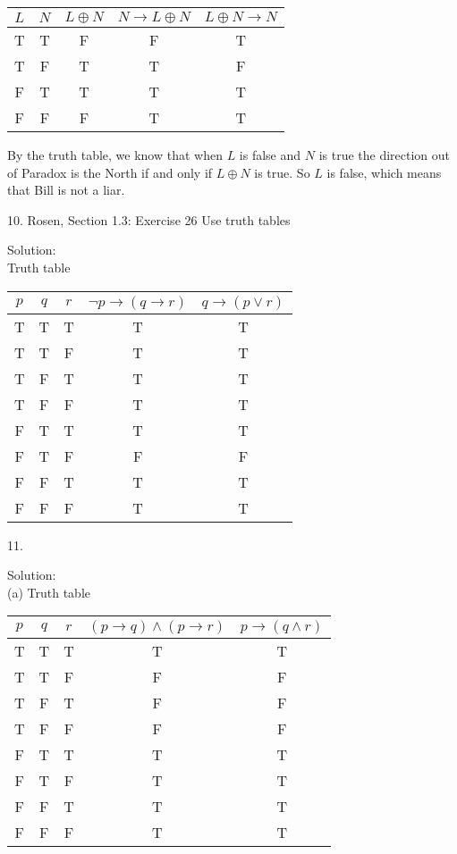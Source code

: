 \documentclass[12pt]{article}
\begin{document}
\begin{center}
\begin{tabular}{c|c|c|c|c}
    $L$ & $N$ & $L \oplus N$ & $N \to L \oplus N$ & $L \oplus N \to N$ \\
\hline
T & T & F & F & T \\
T & F & T & T & F \\
F & T & T & T & T \\
F & F & F & T & T
\end{tabular}
\end{center}

By the truth table, we know that when $L$ is false and $N$ is true the direction out of Paradox is the North if and only if $L \oplus N$ is true. So $L$ is false, which means that Bill is not a liar.
\newline

10. Rosen, Section 1.3: Exercise 26 Use truth tables

\indent Solution:\\
\indent Truth table\\

\begin{center}
\begin{tabular}{c|c|c|c|c}
    $p$ & $q$ & $r$ & $\lnot p \to (q \to r)$ & $q \to (p \lor r)$ \\
\hline
T & T & T & T & T\\
T & T & F & T & T\\
T & F & T & T & T\\
T & F & F & T & T\\
F & T & T & T & T\\
F & T & F & F & F\\
F & F & T & T & T\\
F & F & F & T & T
\end{tabular}
\end{center}

11. 

\indent Solution:\\
\indent (a) Truth table\\
\begin{center}
\begin{tabular}{c|c|c|c|c}
    $p$ & $q$ & $r$ & $(p \to q) \land (p \to r)$ & $p \to (q \land r)$ \\
\hline
T & T & T & T & T \\
T & T & F & F & F \\
T & F & T & F & F \\
T & F & F & F & F \\
F & T & T & T & T \\
F & T & F & T & T \\
F & F & T & T & T \\
F & F & F & T & T
\end{tabular}
\end{center}
\end{document}
